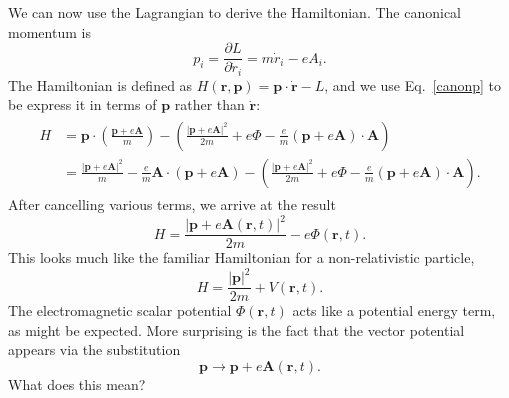 \documentclass[pra,12pt]{revtex4}
\begin{document}
We can now use the Lagrangian to derive the Hamiltonian.  The
canonical momentum is
\begin{equation}
  p_i = \frac{\partial L}{\partial \dot{r}_i} = m\dot{r}_i - e A_i.
  \label{canonp}
\end{equation}
The Hamiltonian is defined as $H(\mathbf{r},\mathbf{p}) = \mathbf{p}
\cdot \dot{\mathbf{r}} - L$, and we use Eq.~\eqref{canonp} to be
express it in terms of $\mathbf{p}$ rather than $\dot{\mathbf{r}}$:
\begin{align}
  \begin{aligned}
    H &= \mathbf{p}\cdot \left(\frac{\mathbf{p}+e\mathbf{A}}{m}\right)
    - \left(\frac{|\mathbf{p}+e\mathbf{A}|^2}{2m}
    + e\Phi - \frac{e}{m}(\mathbf{p}+e\mathbf{A})\cdot \mathbf{A}\right) \\
    &= \frac{|\mathbf{p}+e\mathbf{A}|^2}{m}
    - \frac{e}{m}\mathbf{A}\cdot \left(\mathbf{p}+e\mathbf{A}\right)
    - \left(\frac{|\mathbf{p}+e\mathbf{A}|^2}{2m}
    + e\Phi - \frac{e}{m}(\mathbf{p}+e\mathbf{A})\cdot \mathbf{A}\right).
  \end{aligned}
\end{align}
After cancelling various terms, we arrive at the result
\begin{equation}
  H = \frac{|\mathbf{p}+e\mathbf{A}(\mathbf{r},t)|^2}{2m} - e\Phi(\mathbf{r},t).
\end{equation}
This looks much like the familiar Hamiltonian for a non-relativistic
particle,
\begin{equation*}
  H = \frac{|\mathbf{p}|^2}{2m} + V(\mathbf{r},t).
\end{equation*}
The electromagnetic scalar potential $\Phi(\mathbf{r},t)$ acts like a
potential energy term, as might be expected.  More surprising is the
fact that the vector potential appears via the substitution
\begin{equation}
  \mathbf{p} \rightarrow \mathbf{p} + e\mathbf{A}(\mathbf{r},t).  
\end{equation}
What does this mean?
\end{document}
